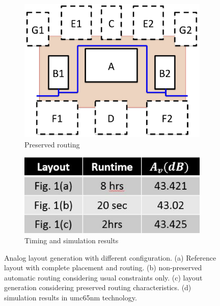 \begin{figure}
\begin{subfigure}[t]{0.4\textwidth}
        \includegraphics[width=\textwidth]{Fig/RoutingPreserv_c.eps}
        \caption{Preserved routing}
        \label{fig:RoutingPreserv_C}
        \end{subfigure}
        \begin{subfigure}[t]{0.4\textwidth}
        \includegraphics[width=\textwidth]{Fig/RoutingPreserv_d.eps}
        \caption{Timing and simulation results}
        \label{fig:RoutingPreserv_d}
        \end{subfigure}
        \caption{Analog layout generation with different configuration. (a) Reference layout with complete placement and routing. (b) non-preserved automatic routing considering usual constraints only. (c) layout generation considering preserved routing characteristics. (d) simulation results in umc65nm technology.}
        \label{fig:RoutingPreserv}
      \end{figure}

